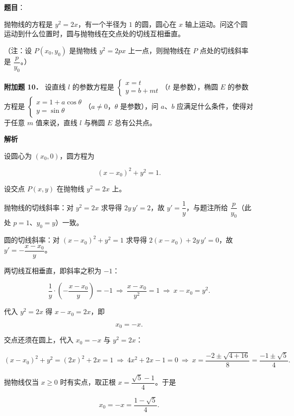 \begin{answer}

\textbf{题目}：

抛物线的方程是 $y^2=2x$，有一个半径为 $1$ 的圆，圆心在 $x$ 轴上运动。问这个圆运动到什么位置时，圆与抛物线在交点处的切线互相垂直。

（注：设 $P(x_0,y_0)$ 是抛物线 $y^2=2px$ 上一点，则抛物线在 $P$ 点处的切线斜率是 $\dfrac{p}{y_0}$。）

\textbf{附加题 10．} 设直线 $l$ 的参数方程是 $\begin{cases}x=t\\ y=b+mt\end{cases}$（$t$ 是参数），椭圆 $E$ 的参数方程是 $\begin{cases}x=1+a\cos\theta\\ y=\sin\theta\end{cases}$（$a\neq0$，$\theta$ 是参数），问 $a$、$b$ 应满足什么条件，使得对于任意 $m$ 值来说，直线 $l$ 与椭圆 $E$ 总有公共点。

\textbf{解析}

设圆心为 $(x_0,0)$，圆方程为

\nopagebreak[4]
\[
(x-x_0)^2+y^2=1.
\]

设交点 $P(x,y)$ 在抛物线 $y^2=2x$ 上。

抛物线的切线斜率：对 $y^2=2x$ 求导得 $2y\,y'=2$，故 $y'=\dfrac1y$，与题注所给 $\dfrac{p}{y_0}$（此处 $p=1$、$y_0=y$）一致。

圆的切线斜率：对 $(x-x_0)^2+y^2=1$ 求导得 $2(x-x_0)+2y\,y'=0$，故 $y'=-\dfrac{x-x_0}{y}$。

两切线互相垂直，即斜率之积为 $-1$：

\nopagebreak[4]
\[
\frac1y\cdot\left(-\frac{x-x_0}{y}\right)=-1
\ \Longrightarrow\ \frac{x-x_0}{y^2}=1
\ \Longrightarrow\ x-x_0=y^2.
\]

代入 $y^2=2x$ 得 $x-x_0=2x$，即

\nopagebreak[4]
\[
x_0=-x.
\]

交点还须在圆上，代入 $x_0=-x$ 与 $y^2=2x$：

\nopagebreak[4]
\[
(x-x_0)^2+y^2=(2x)^2+2x=1
\ \Longrightarrow\ 4x^2+2x-1=0
\ \Longrightarrow\ x=\frac{-2\pm\sqrt{4+16}}{8}=\frac{-1\pm\sqrt5}{4}.
\]

抛物线仅当 $x\geqslant0$ 时有实点，取正根 $x=\dfrac{\sqrt5-1}{4}$。于是

\nopagebreak[4]
\[
x_0=-x=\frac{1-\sqrt5}{4}.
\]


\end{answer}
